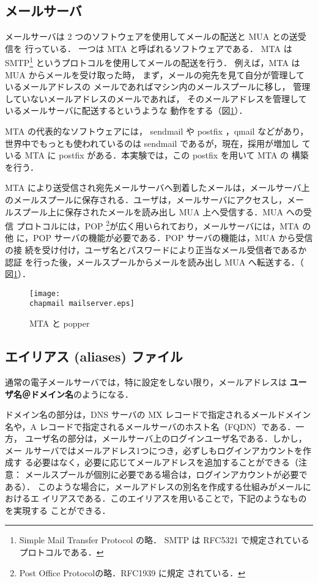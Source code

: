 \subsection*{メールサーバ}
メールサーバは 2 つのソフトウェアを使用してメールの配送と MUA との送受信を
行っている．
一つは MTA と呼ばれるソフトウェアである．
MTA は SMTP\footnote{Simple Mail Transfer Protocol の略．
SMTP は RFC5321 で規定されているプロトコルである．}
というプロトコルを使用してメールの配送を行う．
例えば，MTA は MUA からメールを受け取った時，
まず，メールの宛先を見て自分が管理しているメールアドレスの
メールであればマシン内のメールスプールに移し，
管理していないメールアドレスのメールであれば，
そのメールアドレスを管理しているメールサーバに配送するというような
動作をする（図\ref{fig:07:mailserver.eps}）．

MTA の代表的なソフトウェアには， sendmail や postfix ，qmail などがあり，
世界中でもっとも使われているのは sendmail であるが，現在，採用が増加し
ている MTA に postfix がある．本実験では，この postfix を用いて MTA の
構築を行う．

MTA により送受信され宛先メールサーバへ到着したメールは，メールサーバ上
のメールスプールに保存される．ユーザは，メールサーバにアクセスし，メー
ルスプール上に保存されたメールを読み出し MUA 上へ受信する．MUA への受信
プロトコルには，POP \footnote{Post Office Protocolの略．RFC1939 に規定
  されている．}が広く用いられており，メールサーバには，MTA の他
に，POP サーバの機能が必要である．POP サーバの機能は，MUA から受信の接
続を受け付け，ユーザ名とパスワードにより正当なメール受信者であるか認証
を行った後，メールスプールからメールを読み出し MUA へ転送する．（
図\ref{fig:07:mailserver.eps}）．
% 
 \begin{figure}[hbt]
  \begin{center}
   \texttt{[image: \\chapmail mailserver.eps]}   
   \caption{MTA と popper}
   \label{fig:07:mailserver.eps}
  \end{center}
 \end{figure}


\subsection*{エイリアス (aliases) ファイル}
通常の電子メールサーバでは，特に設定をしない限り，メールアドレスは
{\bf ユーザ名＠ドメイン名}のようになる．

ドメイン名の部分は，DNS サーバの MX レコードで指定されるメールドメイン
名や，A レコードで指定されるメールサーバのホスト名（FQDN）である．一方，
ユーザ名の部分は，メールサーバ上のログインユーザ名である．しかし，メー
ルサーバではメールアドレス1つにつき，必ずしもログインアカウントを作成す
る必要はなく，必要に応じてメールアドレスを追加することができる（注意：
メールスプールが個別に必要である場合は，ログインアカウントが必要である）．
このような場合に，メールアドレスの別名を作成する仕組みがメールにおけるエ
イリアスである．このエイリアスを用いることで，下記のようなものを実現する
ことができる．

